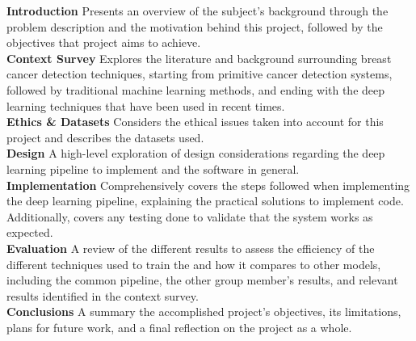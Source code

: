 \tab \textbf{Introduction} \space 
Presents an overview of the subject's background through the problem description and the motivation behind this project, followed by the objectives that project aims to achieve.\\

\textbf{Context Survey} \space
Explores the literature and background surrounding breast cancer detection techniques, starting from primitive cancer detection systems, followed by traditional machine learning methods, and ending with the deep learning techniques that have been used in recent times.\\

\textbf{Ethics \& Datasets} \space
Considers the ethical issues taken into account for this project and describes the datasets used.\\

\textbf{Design} \space
A high-level exploration of design considerations regarding the deep learning pipeline to implement and the software in general.\\

\textbf{Implementation} \space
Comprehensively covers the steps followed when implementing the deep learning pipeline, explaining the practical solutions to implement code. Additionally, covers any testing done to validate that the system works as expected.\\

\textbf{Evaluation} \space
A review of the different results to assess the efficiency of the different techniques used to train the and how it compares to other models, including the common pipeline, the other group member's results, and relevant results identified in the context survey.\\

\textbf{Conclusions} \space
A summary the accomplished project's objectives, its limitations, plans for future work, and a ﬁnal reflection on the project as a whole.